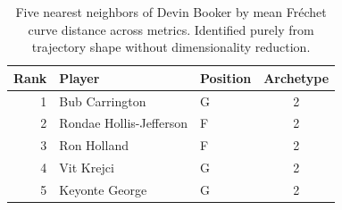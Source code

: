 \begin{table}[htbp]
  \centering\small
  \begin{tabular}{rllc}
    \toprule
    Rank & Player & Position & Archetype \\
    \midrule
    1 & Bub Carrington & G & 2 \\
    2 & Rondae Hollis-Jefferson & F & 2 \\
    3 & Ron Holland & F & 2 \\
    4 & Vit Krejci & G & 2 \\
    5 & Keyonte George & G & 2 \\
    \bottomrule
  \end{tabular}
  \caption{Five nearest neighbors of Devin Booker by mean Fr\'{e}chet curve distance across metrics. Identified purely from trajectory shape without dimensionality reduction.}
  \label{tab:Devin_Booker_frechet_curve_neighbors}
\end{table}

